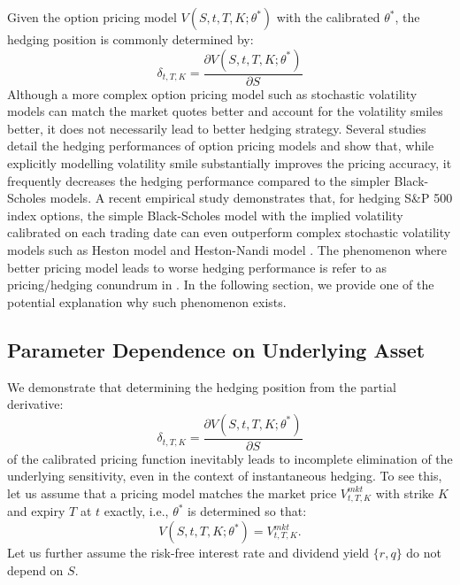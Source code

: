 \documentclass[letterpaper,12pt,titlepage,oneside,final]{book}
\numberwithin{equation}{section}
\theoremstyle{definition}
\newcommand{\Vmkt}{V^{mkt}}
\begin{document}
Given the option pricing model $V(S,t,T,K;\theta^*)$ with the calibrated $\theta^*$, the hedging position is commonly determined by:
\[
\delta_{t,T,K}=  \frac{\partial V(S,t,T,K;\theta^*)}{\partial S}
\]
Although a more complex option pricing model such as stochastic volatility models can match the market quotes better and account for the volatility smiles better, it does not necessarily lead to better hedging strategy. 
Several studies \cite{dumas1998implied,bakshi1997empirical,yung2003empirical, lassance2018comparison} detail the hedging performances of option pricing models and show that, while explicitly
modelling volatility smile substantially improves the pricing
accuracy, it frequently decreases the hedging
performance compared to the simpler  Black-Scholes models. A recent empirical study \cite{lassance2018comparison} demonstrates that, for hedging S\&P 500 index options, the simple Black-Scholes model with the implied volatility calibrated on each trading date can even outperform complex stochastic volatility models such as Heston model \cite{heston1993closed} and Heston-Nandi model \cite{heston2000closed}. The phenomenon where better pricing model leads to worse hedging performance is refer to as pricing/hedging conundrum in \cite{lassance2018comparison}. In the following section, we provide one of the potential explanation why such phenomenon exists.

\subsection{Parameter Dependence on Underlying Asset}
\label{sec：dependence}
We demonstrate that determining the hedging position from the partial derivative:
\[
\delta_{t,T,K}=  \frac{\partial V(S,t,T,K;\theta^*)}{\partial S}
\] of the calibrated pricing function inevitably leads to incomplete elimination of the underlying sensitivity, even in the context of instantaneous hedging. 
To see this,
let us assume that a pricing model matches the market price $\Vmkt_{t,T,K}$ with strike $K$ and expiry $T$  at $t$ exactly, i.e., $\theta^*$ is determined so that:
\begin{equation} 
     V(S,t,T,K;\theta^*)=\Vmkt_{t,T,K}.
\end{equation} 
Let us further assume the risk-free interest rate and dividend yield $\{r,q\}$ do not depend on $S$. 
\end{document}
